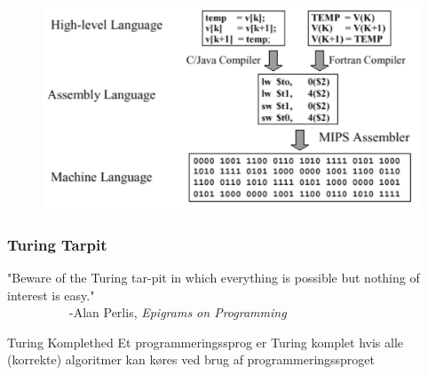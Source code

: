 \documentclass[12pt,t]{beamer}
\begin{document}
\begin{frame}
\begin{figure}[h]
\centering
\includegraphics[scale=0.55]{Img/LangToMachine.pdf}
\end{figure}
\end{frame}
\begin{frame}
\frametitle{Turing Tarpit}
"Beware of the Turing tar-pit in which everything is possible but nothing of interest is easy."\\
~~~~~~~~~~-Alan Perlis, \emph{Epigrams on Programming}\\
\begin{block}{Turing Komplethed}
Et programmeringssprog er Turing komplet hvis alle (korrekte) algoritmer kan 
køres ved brug af programmeringssproget
\end{block}
\end{frame}
\end{document}
